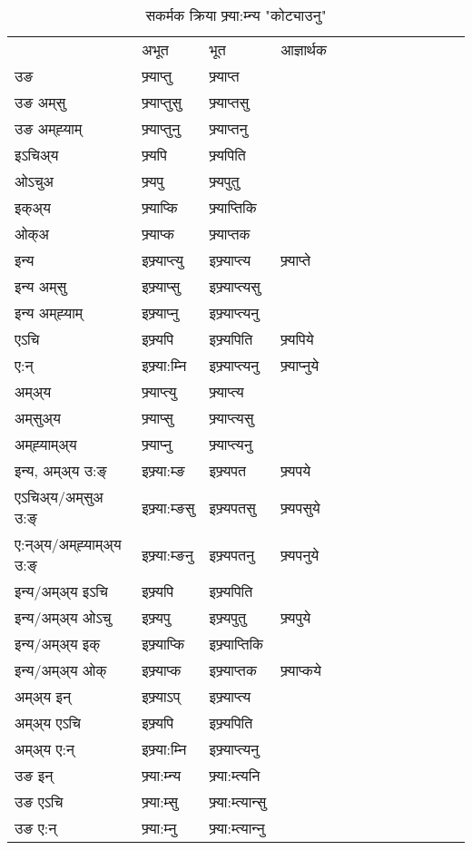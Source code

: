 \begin{table}[H]
\centering
\caption{\label{ɛpt.vt} सकर्मक क्रिया  फ्र्या:म्‍न्य  "कोट्याउनु"  }
\begin{tabular}{l|l|l|l|l|l|l|l|l|l|l|l|l}  \toprule
&अभूत & भूत & आज्ञार्थक \\ 
उङ &फ्र्याप्‍तु &फ्र्याप्‍त \\ 
उङ अम्‌सु&फ्र्याप्‍तुसु &फ्र्याप्‍तसु \\ 
उङ अम्‌ह्‍याम्&फ्र्याप्‍तुनु &फ्र्याप्‍तनु \\ 
इऽचिअ्य &फ्र्यपि &फ्र्यपिति   \\ 
ओऽचुअ        &फ्र्यपु &फ्र्यपुतु   \\ 
इक्अ्य&फ्र्याप्कि &फ्र्याप्‍तिकि   \\ 
ओक्अ &फ्र्याप्क &फ्र्याप्‍तक   \\ 
इन्य & इफ्र्याप्‍त्यु  & इफ्र्याप्‍त्य &फ्र्याप्‍ते  \\ 
इन्य अम्‌सु& इफ्र्याप्सु  & इफ्र्याप्‍त्यसु   \\ 
इन्य अम्‌ह्‍याम्& इफ्र्याप्‍नु  & इफ्र्याप्‍त्यनु   \\ 
एऽचि & इफ्र्यपि & इफ्र्यपिति &फ्र्यपिये    \\ 
ए:न् & इफ्र्या:म्‍नि  & इफ्र्याप्‍त्यनु &फ्र्याप्‍नुये  \\ 
अम्अ्य & फ्र्याप्‍त्यु  & फ्र्याप्‍त्य  \\ 
अम्‌सुअ्य & फ्र्याप्सु & फ्र्याप्‍त्यसु  \\ 
अम्‌ह्‍याम्अ्य & फ्र्याप्‍नु  & फ्र्याप्‍त्यनु \\ 
\midrule
इन्य, अम्अ्य उ:ङ्‌ &इफ्र्या:म्ङ &इफ्र्यपत &फ्र्यपये \\ 
एऽचिअ्य/अम्‌सुअ उ:ङ्‌ &इफ्र्या:म्ङसु &इफ्र्यपतसु &फ्र्यपसुये \\ 
ए:न्अ्य/अम्‌ह्‍याम्अ्य उ:ङ्‌ &इफ्र्या:म्ङनु &इफ्र्यपतनु &फ्र्यपनुये \\ 
इन्य/अम्अ्य इऽचि &इफ्र्यपि &इफ्र्यपिति    \\ 
इन्य/अम्अ्य ओऽचु &इफ्र्यपु &इफ्र्यपुतु  &फ्र्यपुये  \\ 
इन्य/अम्अ्य इक् &इफ्र्याप्कि &इफ्र्याप्‍तिकि   \\ 
इन्य/अम्अ्य ओक् &इफ्र्याप्क &इफ्र्याप्‍तक  &फ्र्याप्कये  \\ 
अम्अ्य इन् & इफ्र्याऽप् & इफ्र्याप्‍त्य   \\ 
अम्अ्य एऽचि & इफ्र्यपि & इफ्र्यपिति    \\ 
अम्अ्य ए:न् & इफ्र्या:म्‍नि  & इफ्र्याप्‍त्यनु  \\ 
\midrule
उङ इन् & फ्र्या:म्‍न्य  & फ्र्या:म्त्यनि  \\ 
उङ एऽचि & फ्र्या:म्सु  & फ्र्या:म्त्यान्सु   \\ 
उङ ए:न्& फ्र्या:म्‍नु  & फ्र्या:म्त्यान्‍नु   \\ 
\bottomrule
\end{tabular}
\end{table}



